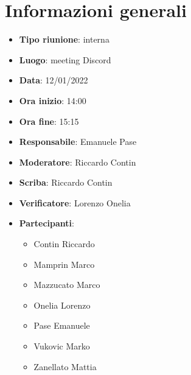 \section{Informazioni generali}
\begin{itemize}
  \item \textbf{Tipo riunione}: interna
  \item \textbf{Luogo}: meeting Discord
  \item \textbf{Data}: 12/01/2022
  \item \textbf{Ora inizio}: 14:00
  \item \textbf{Ora fine}: 15:15
  \item \textbf{Responsabile}: Emanuele Pase
  \item \textbf{Moderatore}: Riccardo Contin
  \item \textbf{Scriba}: Riccardo Contin
  \item \textbf{Verificatore}: Lorenzo Onelia
  \item \textbf{Partecipanti}:
  \begin{itemize}
    \item Contin Riccardo
    \item Mamprin Marco
    \item Mazzucato Marco
    \item Onelia Lorenzo
    \item Pase Emanuele
    \item Vukovic Marko
    \item Zanellato Mattia
  \end{itemize}
\end{itemize}
